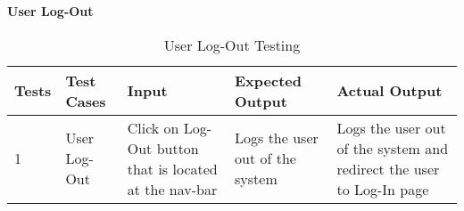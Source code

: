 \newpage
\textbf{User Log-Out}\\
\begin{table}[H]
    \caption{User Log-Out Testing}
        \label{}
    \begin{tabular}{|p{0.3in}|p{1.2in}|p{1.2in}|p{1.2in}|p{1in}|}
        \hline
        Tests & Test Cases & Input &Expected Output & Actual Output \\
        \hline
            1 &User Log-Out & Click on Log-Out button that is located at the nav-bar &Logs the user out of the system &Logs the user out of the system and redirect the user to Log-In page \\
            \hline
\end{tabular}
\end{table}


